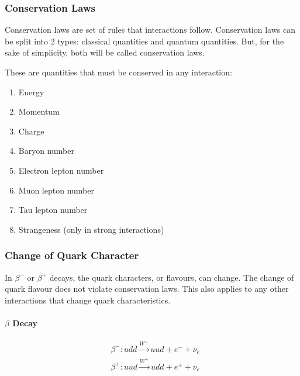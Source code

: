 \documentclass[10pt]{article}
\begin{document}
\begin{multicols*}{2}
	\subsubsection{Conservation Laws}
	Conservation laws are set of rules that interactions follow. Conservation laws can be split into 2 types: classical quantities and quantum quantities. But, for the sake of simplicity, both will be called conservation laws.
	\medskip

	These are quantities that must be conserved in any interaction:
	\medskip
	\begin{enumerate}
		\item Energy
		\item Momentum
		\item Charge
		\item Baryon number
		\item Electron lepton number
		\item Muon lepton number
		\item Tau lepton number
		\item Strangeness (only in strong interactions)
	\end{enumerate}

	\subsubsection{Change of Quark Character}
	In $\beta^-$ or $\beta^+$ decays, the quark characters, or flavours, can change.
	The change of quark flavour does not violate conservation laws. This also
	applies to any other interactions that change quark characteristics.

	\paragraph{$\beta$ Decay}
	\begin{align*}
		 & \beta^-: udd \xrightarrow{W^-}uud + e^- + \bar{\nu}_e \\
		 & \beta^+: uud \xrightarrow{W^+} udd + e^+ + \nu_e      \\
	\end{align*}
\end{multicols*}
\end{document}

